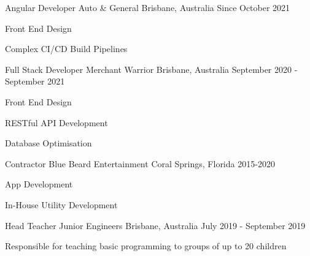 


\begin{cventries}

\cventry
{Angular Developer} %
{Auto \& General} %
{Brisbane, Australia} %
{Since October 2021} %
{ %
\begin{cvitems}
\item {Front End Design}
\item {Complex CI/CD Build Pipelines}
\end{cvitems}
}

\cventry
{Full Stack Developer} %
{Merchant Warrior} %
{Brisbane, Australia} %
{September 2020 - September 2021} %
{ %
\begin{cvitems}
\item {Front End Design}
\item {RESTful API Development}
\item {Database Optimisation}
\end{cvitems}
}


\cventry
{Contractor} %
{Blue Beard Entertainment} %
{Coral Springs, Florida} %
{2015-2020} %
{ %
\begin{cvitems}
\item {App Development}
\item {In-House Utility Development}
\end{cvitems}
}


\cventry
{Head Teacher} %
{Junior Engineers} %
{Brisbane, Australia} %
{July 2019 - September 2019} %
{ %
\begin{cvitems}
\item {Responsible for teaching basic programming to groups of up to 20 children}
\end{cvitems}
}


\end{cventries}
